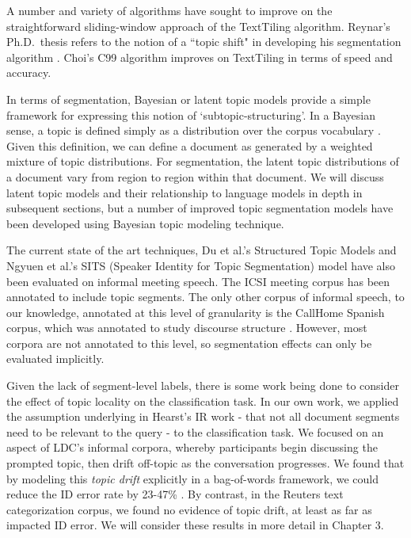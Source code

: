 A number and variety of algorithms have sought to improve on the straightforward sliding-window approach of the TextTiling algorithm.  Reynar's Ph.D.\ thesis refers to the notion of a ``topic shift" in developing his segmentation algorithm \cite{reynar1999}.  Choi's C99 algorithm \cite{choi2000} improves on TextTiling in terms of speed and accuracy.   

In terms of segmentation, Bayesian or latent topic models provide a simple framework for expressing this notion of `subtopic-structuring'.  In a Bayesian sense, a topic is defined simply as a distribution over the corpus vocabulary \cite{wallach2006}.  Given this definition, we can define a document as generated by a weighted mixture of topic distributions.  For segmentation, the latent topic distributions of a document vary from region to region within that document.  We will discuss latent topic models and their relationship to language models in depth in subsequent sections, but a number of improved topic segmentation models have been developed using Bayesian topic modeling technique.  

The current state of the art techniques, Du et al.'s Structured Topic Models \cite{du2013topic} and Ngyuen et al.'s SITS (Speaker Identity for Topic Segmentation) model \cite{nguyen2012sits} have also been evaluated on informal meeting speech.  The ICSI meeting corpus \cite{janin2003icsi} has been annotated to include topic segments.  The only other corpus of informal speech, to our knowledge, annotated at this level of granularity is the CallHome Spanish corpus, which was annotated to study discourse structure \cite{Ries2000}.  However, most corpora are not annotated to this level, so segmentation effects can only be evaluated implicitly.

Given the lack of segment-level labels, there is some work being done to consider the effect of topic locality on the classification task. In our own work, we applied the assumption underlying in Hearst's IR work - that not all document segments need to be relevant to the query - to the classification task.   We focused on an aspect of  LDC's informal corpora, whereby participants begin discussing the prompted topic, then drift off-topic as the conversation progresses.  We found that by modeling this \textit{topic drift} explicitly in a bag-of-words framework, we could reduce the ID error rate by 23-47\% \cite{wintrode2013}.  By contrast, in the Reuters text categorization corpus, we found no evidence of topic drift, at least as far as impacted ID error.  We will consider these results in more detail in Chapter 3.

